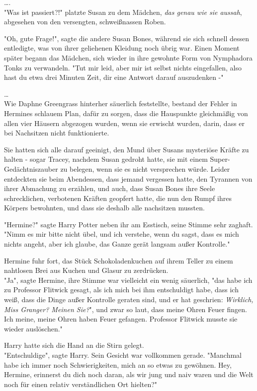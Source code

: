 {….\\ "Was ist passiert?!" platzte Susan zu dem Mädchen, \emph{das genau wie sie aussah}, abgesehen von den versengten, schweißnassen Roben.

"Oh, gute Frage!", sagte die andere Susan Bones, während sie sich schnell dessen entledigte, was von ihrer geliehenen Kleidung noch übrig war. Einen Moment später begann das Mädchen, sich wieder in ihre gewohnte Form von Nymphadora Tonks zu verwandeln. "Tut mir leid, aber mir ist selbst nichts eingefallen, also hast du etwa drei Minuten Zeit, dir eine Antwort darauf auszudenken -"

…\\ Wie Daphne Greengrass hinterher säuerlich feststellte, bestand der Fehler in Hermines schlauem Plan, dafür zu sorgen, dass die Hauspunkte gleichmäßig von allen vier Häusern abgezogen wurden, wenn sie erwischt wurden, darin, dass er bei Nachsitzen nicht funktionierte.

Sie hatten sich alle darauf geeinigt, den Mund über Susans mysteriöse Kräfte zu halten - sogar Tracey, nachdem Susan gedroht hatte, sie mit einem Super-Gedächtniszauber zu belegen, wenn sie es nicht versprechen würde. Leider entdeckten sie beim Abendessen, dass jemand vergessen hatte, den Tyrannen von ihrer Abmachung zu erzählen, und auch, dass Susan Bones ihre Seele schrecklichen, verbotenen Kräften geopfert hatte, die nun den Rumpf ihres Körpers bewohnten, und dass sie deshalb alle nachsitzen mussten.

"Hermine?" sagte Harry Potter neben ihr am Esstisch, seine Stimme sehr zaghaft. "Nimm es mir bitte nicht übel, und ich verstehe, wenn du sagst, dass es mich nichts angeht, aber ich glaube, das Ganze gerät langsam außer Kontrolle."

Hermine fuhr fort, das Stück Schokoladenkuchen auf ihrem Teller zu einem nahtlosen Brei aus Kuchen und Glasur zu zerdrücken.\\ "Ja", sagte Hermine, ihre Stimme war vielleicht ein wenig säuerlich, "das habe ich zu Professor Flitwick gesagt, als ich mich bei ihm entschuldigt habe, dass ich weiß, dass die Dinge außer Kontrolle geraten sind, und er hat geschrien: \emph{Wirklich, Miss Granger? Meinen Sie?}", und zwar so laut, dass meine Ohren Feuer fingen. Ich meine, meine Ohren haben Feuer gefangen. Professor Flitwick musste sie wieder auslöschen."

Harry hatte sich die Hand an die Stirn gelegt.\\ "Entschuldige", sagte Harry. Sein Gesicht war vollkommen gerade. "Manchmal habe ich immer noch Schwierigkeiten, mich an so etwas zu gewöhnen. Hey, Hermine, erinnerst du dich noch daran, als wir jung und naiv waren und die Welt noch für einen relativ verständlichen Ort hielten?"

}
